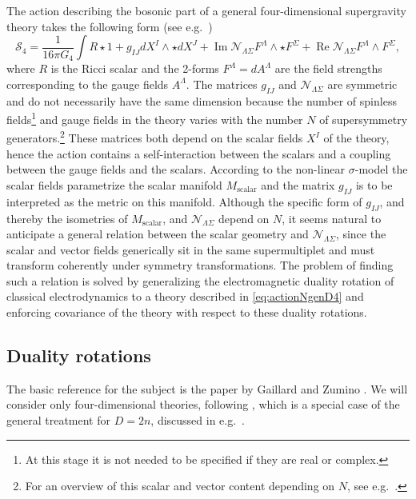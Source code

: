 \documentclass[12pt,twoside]{book}
\newcommand\real{\operatorname{Re}}
\newcommand\imag{\operatorname{Im}}
\begin{document}
The action describing the bosonic part of a general four-dimensional supergravity theory takes the following form (see e.g.\ \cite{DAuria:uq})
\begin{equation}\label{eq:actionNgenD4}
\mathcal{S}_{4} = \frac{1}{16 \pi G_{4}} \int R \star 1+ g_{IJ} d X^{I}  \wedge \star d X^{J} + \imag \mathcal{N}_{\Lambda\Sigma}  F^{\Lambda}\wedge\star F^{\Sigma}
+ \real \mathcal{N}_{\Lambda\Sigma}F^{\Lambda}\wedge F^{\Sigma},
\end{equation} where $R$ is the Ricci scalar and the 2-forms $F^{\Lambda}=dA^{\Lambda}$ are the field strengths corresponding to the gauge fields $A^{\Lambda}$.
The matrices $g_{IJ}$ and $\mathcal{N}_{\Lambda\Sigma}$ are symmetric and do not necessarily have the same dimension because the number of spinless fields\footnote{At this stage it is not needed to be specified if they are real or complex.} and gauge fields in the theory varies with the number $N$ of supersymmetry generators.\footnote{For an overview of this scalar and vector content depending on $N$, see e.g.\ \cite{Fre:1996qr}.} These matrices both depend on the scalar fields $X^{I}$ of the theory, hence the action contains a self-interaction between the scalars and a coupling between the gauge fields and the scalars.
According to the non-linear $\sigma$-model the scalar fields parametrize the scalar manifold $M_{\mathrm{scalar}}$ and the matrix $g_{IJ}$ is to be interpreted as the metric on this manifold. Although the specific form of $g_{IJ}$, and thereby the isometries of $M_{\mathrm{scalar}}$, and $\mathcal{N}_{\Lambda\Sigma}$ depend on $N$, it seems natural to anticipate a general relation between the scalar geometry and $\mathcal{N}_{\Lambda\Sigma}$, since the scalar and vector fields generically sit in the same supermultiplet and must transform coherently under symmetry transformations. The problem of finding such a relation is solved by generalizing the electromagnetic duality rotation of classical electrodynamics to a theory described in \eqref{eq:actionNgenD4} and enforcing covariance of the theory with respect to these duality rotations.

\subsection{Duality rotations}

The basic reference for the subject is the paper by Gaillard and Zumino \cite{Gaillard:1981rj}. We will consider only four-dimensional theories, following \cite{DAuria:uq}, which is a special case of the general treatment for $D=2n$, discussed in e.g.\ \cite{Fre:1996qr}.\\
\end{document}
